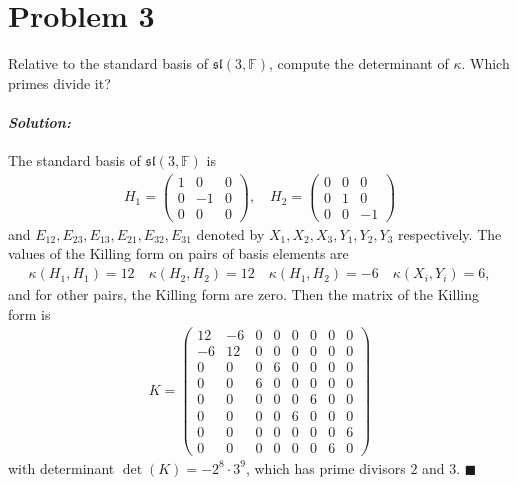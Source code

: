 \documentclass[12pt, a4paper]{article}
\newenvironment{solution}
  {\paragraph{\textit{Solution:}}\par\medskip}
  {\hfill$\blacksquare$\vspace{0.1cm}}
\begin{document}
\section*{Problem 3}
Relative to the standard basis of $\mathfrak{sl}(3, \mathbb{F})$, compute the determinant of $\kappa$. Which primes divide it?


\begin{solution}
  The standard basis of $\mathfrak{sl}(3, \mathbb{F})$ is 
  \begin{align*}
    H_1 = \begin{pmatrix} 1 & 0 & 0 \\ 0 & -1 & 0 \\ 0 & 0 & 0 \end{pmatrix}, \quad 
    H_2 = \begin{pmatrix} 0 & 0 & 0 \\ 0 & 1 & 0 \\ 0 & 0 & -1 \end{pmatrix}
  \end{align*}
  and $E_{12},E_{23},E_{13},E_{21},E_{32},E_{31}$ denoted by $X_1,X_2,X_3,Y_1,Y_2,Y_3$ respectively. 
  The values of the Killing form on pairs of basis elements are 
  \begin{align*}
    \kappa(H_1, H_1) =  12 \quad \kappa(H_2, H_2) =  12 \quad \kappa(H_1, H_2) =  -6 \quad \kappa(X_i,Y_i)= 6,
  \end{align*}
  and for other pairs, the Killing form are zero. Then the matrix of the Killing form is 
  \begin{align*}
    K = 
\begin{pmatrix}
12 & -6 & 0 & 0 & 0 & 0 & 0 & 0 \\
-6 & 12 & 0 & 0 & 0 & 0 & 0 & 0 \\
0 & 0 & 0 & 6 & 0 & 0 & 0 & 0 \\
0 & 0 & 6 & 0 & 0 & 0 & 0 & 0 \\
0 & 0 & 0 & 0 & 0 & 6 & 0 & 0 \\
0 & 0 & 0 & 0 & 6 & 0 & 0 & 0 \\
0 & 0 & 0 & 0 & 0 & 0 & 0 & 6 \\
0 & 0 & 0 & 0 & 0 & 0 & 6 & 0 
\end{pmatrix}
  \end{align*}
with determinant $\det(K) = - 2^8 \cdot 3^9$, which has prime divisors $2$ and $3$.
\end{solution}
\end{document}
